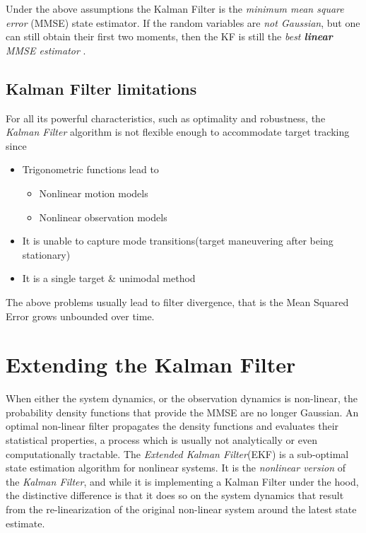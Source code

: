 Under the above assumptions the Kalman Filter is the \emph{minimum mean square error }(MMSE) state estimator. If the random variables are \emph{not Gaussian}, but one can still obtain their first two moments, then the KF is still the \emph{best \textbf{linear} MMSE estimator} \cite{Shalom1995}.

\subsection{Kalman Filter limitations}

For all its powerful characteristics, such as optimality and robustness, the \emph{Kalman Filter} algorithm is not flexible enough to accommodate target tracking\cite{Shalom1995} since

\begin{itemize}
	\item Trigonometric functions lead to
		\begin{itemize}
			\item Nonlinear motion models
			\item Nonlinear observation models
		\end{itemize}
	\item It is unable to capture mode transitions(target maneuvering after being stationary)
	\item It is a single target \& unimodal method
\end{itemize}

The above problems usually lead to filter divergence, that is the Mean Squared Error grows unbounded over time.

\section{Extending the Kalman Filter}

When either the system dynamics, or the observation dynamics is non-linear, the probability density functions that provide the MMSE are no longer Gaussian. An optimal non-linear filter propagates the density functions and evaluates their statistical properties, a process which is usually not analytically or even computationally tractable. The \emph{Extended Kalman Filter}(EKF) is a sub-optimal state estimation algorithm for nonlinear systems. It is the \emph{nonlinear version} of the \emph{Kalman Filter}, and while it is implementing a Kalman Filter under the hood, the distinctive difference is that it does so on the system dynamics that result from the re-linearization of the original non-linear system around the latest state estimate.
